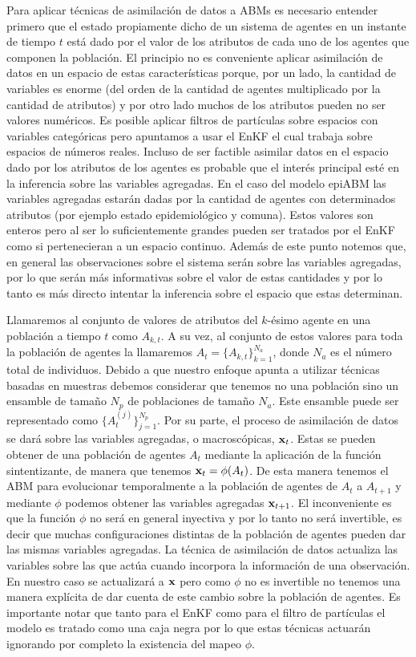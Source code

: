 Para aplicar técnicas de asimilación de datos a ABMs es necesario entender primero que el estado propiamente dicho de un sistema de agentes en un instante de tiempo $t$ está dado por el valor de los atributos de cada uno de los agentes que componen la población. El principio no es conveniente aplicar asimilación de datos en un espacio de estas características porque, por un lado, la cantidad de variables es enorme (del orden de la cantidad de agentes multiplicado por la cantidad de atributos) y por otro lado muchos de los atributos pueden no ser valores numéricos. Es posible aplicar filtros de partículas sobre espacios con variables categóricas pero apuntamos a usar el EnKF el cual trabaja sobre espacios de números reales. Incluso de ser factible asimilar datos en el espacio dado por los atributos de los agentes es probable que el interés principal esté en la inferencia sobre las variables agregadas. En el caso del modelo epiABM las variables agregadas estarán dadas por la cantidad de agentes con determinados atributos (por ejemplo estado epidemiológico y comuna). Estos valores son enteros pero al ser lo suficientemente grandes pueden ser tratados por el EnKF como si pertenecieran a un espacio continuo. Además de este punto notemos que, en general las observaciones sobre el sistema serán sobre las variables agregadas, por lo que serán más informativas sobre el valor de estas cantidades y por lo tanto es más directo intentar la inferencia sobre el espacio que estas determinan.

Llamaremos al conjunto de valores de atributos del $k$-ésimo agente en una población a tiempo $t$ como $A_{k, t}$. A su vez, al conjunto de estos valores para toda la población de agentes la llamaremos $A_t = \{ A_{k, t} \}_{k=1}^{N_a}$, donde $N_a$ es el número total de individuos. Debido a que nuestro enfoque apunta a utilizar técnicas basadas en muestras debemos considerar que tenemos no una población sino un ensamble de tamaño $N_p$ de poblaciones de tamaño $N_a$. Este ensamble puede ser representado como $\{ A_{t}^{(j)} \}_{j=1}^{N_p}$. Por su parte, el proceso de asimilación de datos se dará sobre las variables agregadas, o macroscópicas, $\mathbf{x}_t$. Estas se pueden obtener de una población de agentes $A_t$ mediante la aplicación de la función sintentizante, de manera que tenemos $\mathbf{x}_t = \phi (A_t)$. De esta manera tenemos el ABM para evolucionar temporalmente a la población de agentes de $A_t$ a $A_{t+1}$ y mediante $\phi$ podemos obtener las variables agregadas $\mathbf{x}_{t+1}$. El inconveniente es que la función $\phi$ no será en general inyectiva y por lo tanto no será invertible, es decir que muchas configuraciones distintas de la población de agentes pueden dar las mismas variables agregadas. La técnica de asimilación de datos actualiza las variables sobre las que actúa cuando incorpora la información de una observación. En nuestro caso se actualizará a $\mathbf{x}$ pero como $\phi$ no es invertible no tenemos una manera explícita de dar cuenta de este cambio sobre la población de agentes. Es importante notar que tanto para el EnKF como para el filtro de partículas el modelo es tratado como una caja negra por lo que estas técnicas actuarán ignorando por completo la existencia del mapeo $\phi$.

